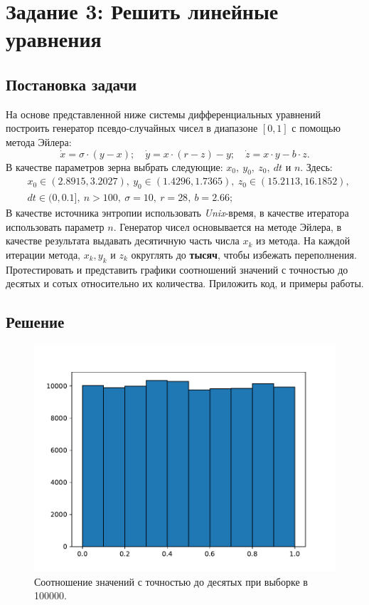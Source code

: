 \section{Задание 3: Решить линейные уравнения}
    \subsection{Постановка задачи}
        На основе представленной ниже системы дифференциальных уравнений построить генератор псевдо-случайных чисел в диапазоне \( [0, 1] \) с помощью метода Эйлера:
        \[ \dot{x} = \sigma \cdot (y - x); \quad \dot{y} = x \cdot (r - z) - y; \quad \dot{z} = x \cdot y - b \cdot z. \]
        В качестве параметров зерна выбрать следующие: \( x_0, ~ y_0, ~ z_0, ~ dt \) и \( n \). Здесь:
        \[ \begin{aligned}
            &x_0 \in (2.8915, 3.2027), ~
            y_0 \in (1.4296, 1.7365), ~
            z_0 \in (15.2113, 16.1852), \\
            &dt \in (0, 0.1], ~
            n > 100, ~
            \sigma = 10, ~
            r = 28, ~
            b = 2.66;
        \end{aligned} \]
        В качестве источника энтропии использовать \textit{Unix}-время, в качестве итератора использовать параметр \( n \). Генератор чисел основывается на методе Эйлера, в качестве результата выдавать десятичную часть числа \( x_k \) из метода. На каждой итерации метода, \( x_k, y_k \) и \( z_k \) округлять до \textbf{тысяч}, чтобы избежать переполнения. Протестировать и представить графики соотношений значений с точностью до десятых и сотых относительно их количества. Приложить код, и примеры работы. 

    
    \subsection{Решение}
        \begin{figure}[H]
            \centering
            \includegraphics[width=14cm]{pictures/task3_1.pdf}
            \caption{Соотношение значений с точностью до десятых при выборке в 100000.}
        \end{figure}

